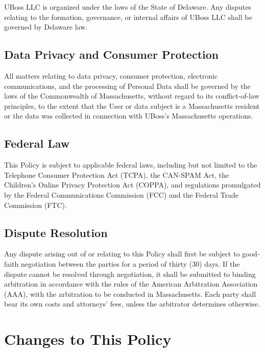 \documentclass[11pt, letterpaper]{article}
\begin{document}
UBoss LLC is organized under the laws of the State of Delaware. Any disputes relating
to the formation, governance, or internal affairs of UBoss LLC shall be governed by
Delaware law.

\subsection{Data Privacy and Consumer Protection}

All matters relating to data privacy, consumer protection, electronic communications,
and the processing of Personal Data shall be governed by the laws of the Commonwealth
of Massachusetts, without regard to its conflict-of-law principles, to the extent that
the User or data subject is a Massachusetts resident or the data was collected in
connection with UBoss's Massachusetts operations.

\subsection{Federal Law}

This Policy is subject to applicable federal laws, including but not limited to the
Telephone Consumer Protection Act (TCPA), the CAN-SPAM Act, the Children's Online
Privacy Protection Act (COPPA), and regulations promulgated by the Federal
Communications Commission (FCC) and the Federal Trade Commission (FTC).

\subsection{Dispute Resolution}

Any dispute arising out of or relating to this Policy shall first be subject to
good-faith negotiation between the parties for a period of thirty (30) days. If the
dispute cannot be resolved through negotiation, it shall be submitted to binding
arbitration in accordance with the rules of the American Arbitration Association (AAA),
with the arbitration to be conducted in Massachusetts. Each party shall bear its own
costs and attorneys' fees, unless the arbitrator determines otherwise.

\section{Changes to This Policy}
\end{document}
